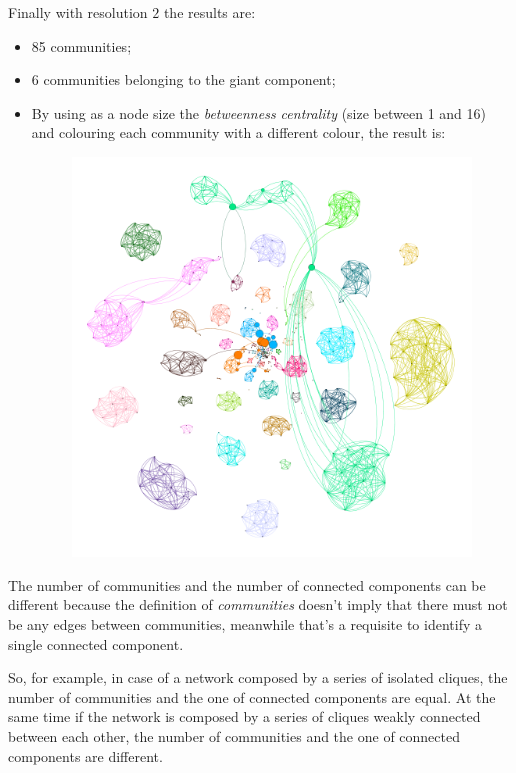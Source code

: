 \documentclass{article}
\begin{document}
        \par\noindent Finally with resolution \(2\) the results are:
        \begin{itemize}
            \item 85 communities;
            \item 6 communities belonging to the giant component;
            \item By using as a node size the \textit{betweenness centrality} (size between 1 and 16) and colouring each community with a different colour, the result is:
            \begin{figure}[H]
                \centering
             \includegraphics[width=1\textwidth]{3.3.png}
                \caption{}
                \label{fig:figure-3.3}
            \end{figure}
        \end{itemize}
        
        \noindent The number of communities and the number of connected components can be different because the definition of \textit{communities} doesn't imply that there must not be any edges between communities, meanwhile that's a requisite to identify a single connected component.\newline
        
        \par\noindent So, for example, in case of a network composed by a series of isolated cliques, the number of communities and the one of connected components are equal. At the same time if the network is composed by a series of cliques weakly connected between each other, the number of communities and the one of connected components are different.
\end{document}
